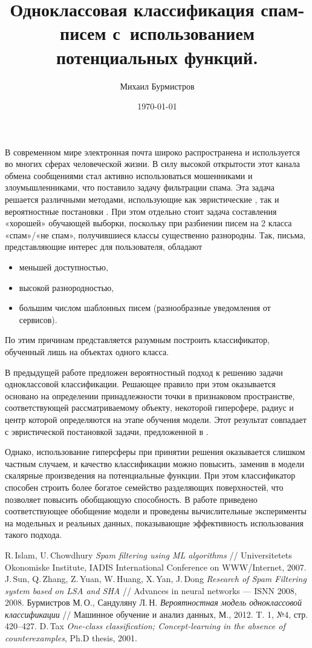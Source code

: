 \documentclass[12pt,a4paper,oneside]{article}
\begin{document}
	\title{Одноклассовая классификация спам-писем с~использованием потенциальных функций.}
	\author{Михаил Бурмистров}
	\date{\today}
	\maketitle

В современном мире электронная почта широко распространена и используется во многих сферах человеческой жизни. 
В силу высокой открытости этот канала обмена сообщениями стал активно использоваться мошенниками и злоумышленниками, что поставило задачу фильтрации спама. 
Эта задача решается различными методами, использующие как эвристические \cite{Islam2007, Sun2008}, так и вероятностные постановки . 
При этом отдельно стоит задача составления «хорошей» обучающей выборки, поскольку при разбиении писем на 2 класса «спам»/«не спам», получившиеся классы существенно разнородны. Так, письма, представляющие интерес для пользователя, обладают
\begin{itemize}
		\item меньшей доступностью,
		\item высокой разнородностью,
		\item большим числом шаблонных писем (разнообразные уведомления от сервисов).
\end{itemize}
По этим причинам представляется разумным построить классификатор, обученный лишь на объектах одного класса. 

В предыдущей работе \cite{JMLDA2012no4} предложен вероятностный подход к решению задачи одноклассовой классификации. 
Решающее правило при этом оказывается основано на определении принадлежности точки в признаковом пространстве, соответствующей рассматриваемому объекту, некоторой гиперсфере, радиус и центр которой определяются на этапе обучения модели. 
Этот результат совпадает с эвристической постановкой задачи, предложенной в \cite{Tax2001}. 

Однако, использование гиперсферы при принятии решения оказывается слишком частным случаем, и качество классификации можно повысить, заменив в модели скалярные произведения на потенциальные функции. 
При этом классификатор способен строить более богатое семейство разделяющих поверхностей, что позволяет повысить обобщающую способность. 
В работе приведено соответствующее обобщение модели и проведены вычислительные эксперименты на модельных и реальных данных, показывающие эффективность использования такого подхода. 

\begin{thebibliography}{99}
	 R.\,Islam, U.\,Chowdhury \textit{Spam filtering using ML algorithms} // Universitetets Okonomiske Institute, IADIS International Conference on WWW/Internet, 2007.
	 J.\,Sun, Q.\,Zhang, Z.\,Yuan, W.\,Huang, X.\,Yan, J.\,Dong \textit{Research of Spam Filtering system based on LSA and SHA} // Advances in neural networks --- ISNN 2008, 2008.
	 Бурмистров М.\,О., Сандуляну Л.\,Н. \textit{Вероятностная модель одноклассовой классификации} // Машинное обучение и анализ данных, М., 2012. T. 1, №4, стр. 420--427.
	 D.\,Tax \textit{One-class classification; Concept-learning in the absence of
	counterexamples}, Ph.D thesis, 2001.
\end{thebibliography}
\end{document}

